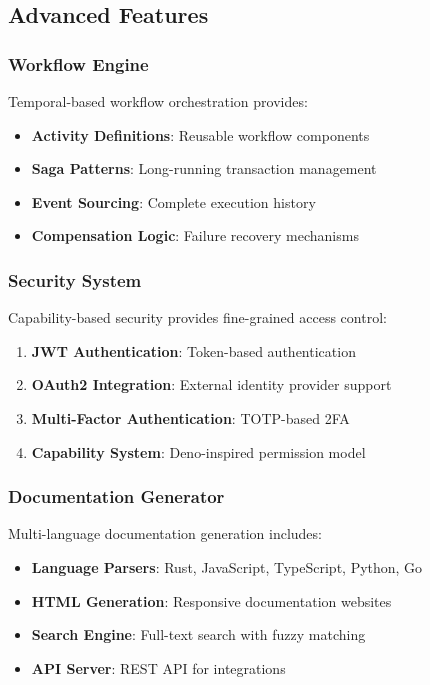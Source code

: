 \documentclass[11pt,a4paper]{article}
\begin{document}
\subsection{Advanced Features}
\label{subsec:advanced_features}

\subsubsection{Workflow Engine}
\label{subsubsec:workflow_engine}

Temporal-based workflow orchestration provides:

\begin{itemize}
\item \textbf{Activity Definitions}: Reusable workflow components
\item \textbf{Saga Patterns}: Long-running transaction management
\item \textbf{Event Sourcing}: Complete execution history
\item \textbf{Compensation Logic}: Failure recovery mechanisms
\end{itemize}

\subsubsection{Security System}
\label{subsubsec:security_system}

Capability-based security provides fine-grained access control:

\begin{enumerate}
\item \textbf{JWT Authentication}: Token-based authentication
\item \textbf{OAuth2 Integration}: External identity provider support
\item \textbf{Multi-Factor Authentication}: TOTP-based 2FA
\item \textbf{Capability System}: Deno-inspired permission model
\end{enumerate}

\subsubsection{Documentation Generator}
\label{subsubsec:docs_generator}

Multi-language documentation generation includes:

\begin{itemize}
\item \textbf{Language Parsers}: Rust, JavaScript, TypeScript, Python, Go
\item \textbf{HTML Generation}: Responsive documentation websites
\item \textbf{Search Engine}: Full-text search with fuzzy matching
\item \textbf{API Server}: REST API for integrations
\end{itemize}
\end{document}
